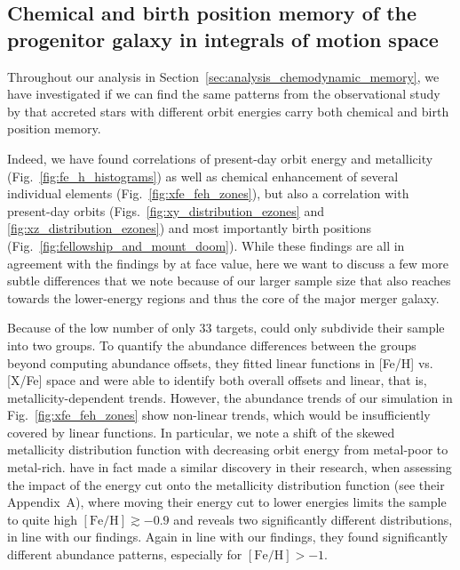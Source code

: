 \documentclass[fleqn,usenatbib]{mnras}
\begin{document}
\subsection{Chemical and birth position memory of the progenitor galaxy in integrals of motion space} \label{sec:discussion_memory}

Throughout our analysis in Section~\ref{sec:analysis_chemodynamic_memory}, we have investigated if we can find the same patterns from the observational study by \citet{Skuladottir2025} that accreted stars with different orbit energies carry both chemical and birth position memory.

Indeed, we have found correlations of present-day orbit energy and metallicity (Fig.~\ref{fig:fe_h_histograms}) as well as chemical enhancement of several individual elements (Fig.~\ref{fig:xfe_feh_zones}), but also a correlation with present-day orbits (Figs.~\ref{fig:xy_distribution_ezones} and \ref{fig:xz_distribution_ezones}) and most importantly birth positions (Fig.~\ref{fig:fellowship_and_mount_doom}). While these findings are all in agreement with the findings by \citet{Skuladottir2025} at face value, here we want to discuss a few more subtle differences that we note because of our larger sample size that also reaches towards the lower-energy regions and thus the core of the major merger galaxy.

Because of the low number of only 33 targets, \citet{Skuladottir2025} could only subdivide their sample into two groups. To quantify the abundance differences between the groups beyond computing abundance offsets, they fitted linear functions in [Fe/H] vs. [X/Fe] space and were able to identify both overall offsets and linear, that is, metallicity-dependent trends. However, the abundance trends of our simulation in Fig.~\ref{fig:xfe_feh_zones} show non-linear trends, which would be insufficiently covered by linear functions. In particular, we note a shift of the skewed metallicity distribution function with decreasing orbit energy from metal-poor to metal-rich. \citet{Skuladottir2025} have in fact made a similar discovery in their research, when assessing the impact of the energy cut onto the metallicity distribution function (see their Appendix~A), where moving their energy cut to lower energies limits the sample to quite high $\mathrm{[Fe/H]} \gtrsim -0.9$ and reveals two significantly different distributions, in line with our findings. Again in line with our findings, they found significantly different abundance patterns, especially for $\mathrm{[Fe/H]} > -1$.
\end{document}
